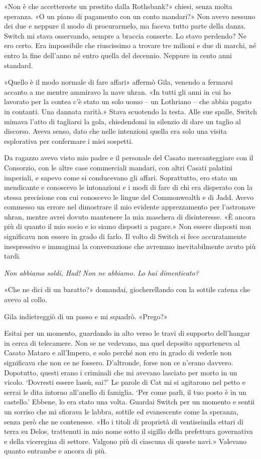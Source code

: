 «Non è che accettereste un prestito dalla Rothsbank?» chiesi, senza
molta speranza. «O un piano di pagamento con un conto mandari?» Non
avevo nessuno dei due e neppure il modo di procurarmelo, ma faceva tutto
parte della danza. Switch mi stava osservando, sempre a braccia
conserte. Lo stavo perdendo? Ne ero certo. Era impossibile che
riuscissimo a trovare tre milioni e due di marchi, né entro la fine
dell'anno né entro quella del decennio. Neppure in cento anni standard.

«Quello è il modo normale di fare affari» affermò Gila, venendo a
fermarsi accanto a me mentre ammiravo la nave uhran. «In tutti gli anni
in cui ho lavorato per la contea c'è stato un solo uomo -- un Lothriano
-- che abbia pagato in contanti. Una dannata rarità.» Stava scuotendo la
testa. Alle sue spalle, Switch mimava l'atto di tagliarsi la gola,
chiedendomi in silenzio di dare un taglio al discorso. Aveva senso, dato
che nelle intenzioni quella era solo una visita esplorativa per
confermare i miei sospetti.

Da ragazzo avevo visto mio padre e il personale del Casato
mercanteggiare con il Consorzio, con le altre case commerciali mandari,
con altri Casati palatini imperiali, e sapevo come si conducevano gli
affari. Soprattutto, ero stato un mendicante e conoscevo le intonazioni
e i modi di fare di chi era disperato con la stessa precisione con cui
conoscevo le lingue del Commonwealth e di Jadd. Avevo commesso un errore
nel dimostrare il mio evidente apprezzamento per l'astronave uhran,
mentre avrei dovuto mantenere la mia maschera di disinteresse. «È ancora
più di quanto il mio socio e io siamo disposti a pagare.» Non essere
disposti non significava non essere in grado di farlo. Il volto di
Switch si fece accuratamente inespressivo e immaginai la conversazione
che avremmo inevitabilmente avuto più tardi.

\emph{Non abbiamo soldi, Had! Non ne abbiamo. Lo hai dimenticato?}

«Che ne dici di un baratto?» domandai, giocherellando con la sottile
catena che avevo al collo.

Gila indietreggiò di un passo e mi squadrò. «Prego?»

Esitai per un momento, guardando in alto verso le travi di supporto
dell'hangar in cerca di telecamere. Non se ne vedevano, ma quel deposito
apparteneva al Casato Mataro e all'Impero, e solo perché non ero in
grado di vederle non significava che non ce ne fossero. D'altronde,
forse non ce n'erano davvero. Dopotutto, questi erano i criminali che mi
avevano lasciato per morto in un vicolo. `Dovresti essere lassù, sai?'
Le parole di Cat mi si agitarono nel petto e serrai le dita intorno
all'anello di famiglia. `Per come parli, il tuo posto è in un castello.'
Ebbene, lo era stato una volta. Guardai Switch per un momento e sentii
un sorriso che mi sfiorava le labbra, sottile ed evanescente come la
speranza, senza però che ne contenesse. «Ho i titoli di proprietà di
ventiseimila ettari di terra su Delos, trattenuti in mio nome sotto il
sigillo della prefettura governativa e della viceregina di settore.
Valgono più di ciascuna di queste navi.» Valevano quanto entrambe e
ancora di più.

